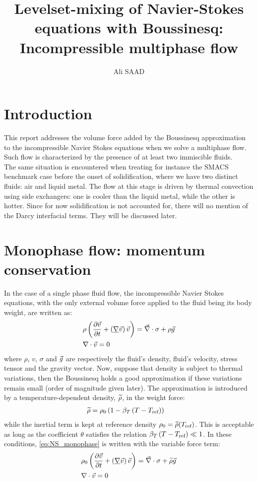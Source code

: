 \documentclass[11pt,a4paper]{article}
\title{Levelset-mixing of Navier-Stokes equations with Boussinesq:\\ Incompressible multiphase flow }
\author{Ali SAAD}
\begin{document}
\maketitle
\section{Introduction}
This report addresses the volume force added by the Boussinesq approximation to the incompressible Navier Stokes equations
when we solve a multiphase flow. Such flow is characterized by the presence of at least two immiscible fluids. \\
The same situation is encountered when treating for instance the SMACS benchmark case before the onset of solidification, where we have two distinct fluids: air and liquid metal.
The flow at this stage is driven by thermal convection using side exchangers: one is cooler than the liquid metal, while the other is hotter.
Since for now solidification is not accounted for, there will no mention of the Darcy interfacial terms. They will be discussed later.
\section{Monophase flow: momentum conservation}
In the case of a single phase fluid flow, the incompressible Navier Stokes equations, with the only external volume 
force applied to the fluid being its body weight, are written as:
\begin{align}
\label{eq:NS_monophase}
& \rho \left( \frac{\partial \vec{v}}{\partial t} + \left( \underline{\nabla} \vec{v} \right) \vec{v}  \right) = \vec{\nabla} \cdot \sigma + \rho \vec{g} \\ 
& \nabla \cdot \vec{v} = 0
\end{align}
where $\rho$, $v$, $\sigma$ and $\vec{g}$ are respectively the fluid's density, fluid's velocity, stress tensor and the gravity vector.
Now, suppose that density is subject to thermal variations, then the Boussinesq holds a good approximation if these variations remain small (order of magnitude given later).
The approximation is introduced by a temperature-dependent density, $\widetilde{\rho}$, in the weight force:
\begin{align}
\label{eq:boussinesq}
\rhobouss %
          	&= \rho_0 \brac{1-\betaT \brac{T-\Tref}}
\end{align}
while the inertial term is kept at reference density $\rho_0 = \widetilde{\rho}(T_{\text{ref}})$. This is acceptable as long as the coefficient $\theta$
satisfies the relation $\beta_T \left( T-T_{\text{ref}} \right) \ll 1$.
In these conditions, \eqref{eq:NS_monophase} is written with the variable force term:
\begin{align}
\label{eq:NS_monophase_boussinesq}
& \rho_0 \left( \frac{\partial \vec{v}}{\partial t} + \left( \underline{\nabla} \vec{v} \right) \vec{v}  \right) = \vec{\nabla} \cdot \sigma + \widetilde{\rho} \vec{g} \\ 
& \nabla \cdot \vec{v} = 0
\end{align}
\end{document}
